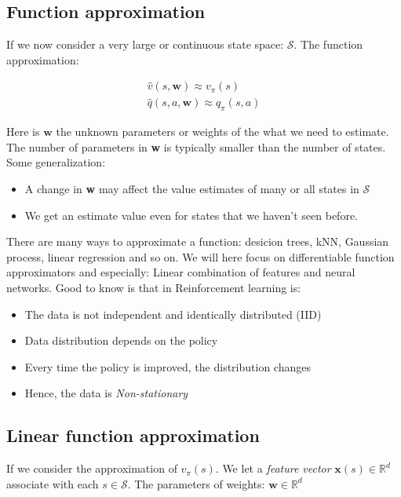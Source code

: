 \subsection*{Function approximation}
If we now consider a very large or continuous state space: $\mathcal{S}$. The function approximation:

	\begin{equation}
	\begin{aligned}
		\hat{v} (s, \textbf{w}) \approx v_\pi(s) \\
		\hat{q} (s,a,\textbf{w}) \approx q_\pi(s,a)
	\end{aligned}
	\end{equation}

Here is $\textbf{w}$ the unknown parameters or weights of the what we need to estimate. The number of parameters in \textbf{w} is typically smaller than the number of states. Some generalization:
	\begin{itemize}
		\item A change in \textbf{w} may affect the value estimates of many or all states in $\mathcal{S}$
		\item We get an estimate value even for states that we haven't seen before.
	\end{itemize}

There are many ways to approximate a function: desicion trees, kNN, Gaussian process, linear regression and so on. We will here focus on differentiable function approximators and especially: Linear combination of features and neural networks. Good to know is that in Reinforcement learning is:

	\begin{itemize}
		\item The data is not independent and identically distributed (IID)
		\item Data distribution depends on the policy
		\item Every time the policy is improved, the distribution changes
		\item Hence, the data is \emph{Non-stationary}
	\end{itemize}

\subsection*{Linear function approximation}
If we consider the approximation of $v_\pi(s)$. We let a \emph{feature vector} $\textbf{x}(s) \in \mathbb{R}^{d}$  associate with each $s \in \mathcal{S}$. The parameters of weights: $\textbf{w} \in \mathbb{R}^{d}$

